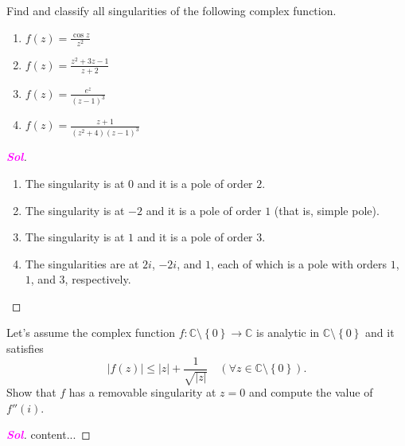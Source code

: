 \documentclass{article}
\theoremstyle{definition}
\newcommand{\set}[1]{\left\{#1\right\}}
\newcommand{\C}{\mathbb{C}}
\newcommand{\abs}[1]{\left\lvert #1 \right\rvert}
\newcommand{\sol}{\textcolor{magenta}{\bf Sol}}
\begin{document}
\vspace{8pt}
\begin{tcolorbox}[colback=white,colframe=white,arc=5pt,title={\color{black}\bf $\bullet$ Classification of Singularities II}]
	Find and classify all singularities of the following complex function.
	\begin{enumerate}[(1)]
		\item $\displaystyle f(z)=\frac{\cos z}{z^2}$
		\item $\displaystyle f(z)=\frac{z^2+3z-1}{z+2}$
		\item $\displaystyle f(z)=\frac{e^z}{(z-1)^3}$
		\item $\displaystyle f(z)=\frac{z+1}{(z^2+4)(z-1)^3}$
	\end{enumerate}
\end{tcolorbox}
\begin{proof}[\sol]
	\begin{enumerate}[(1)]
		\item The singularity is at $0$ and it is a pole of order $2$.
		\item The singularity is at $-2$ and it is a pole of order $1$ (that is, simple pole).
		\item The singularity is at $1$ and it is a pole of order $3$.
		\item The singularities are at $2i$, $-2i$, and $1$, each of which is a pole with orders $1$, $1$, and $3$, respectively.
	\end{enumerate}
\end{proof}
\vspace{8pt}
\begin{tcolorbox}[colback=white,colframe=white,arc=5pt,title={\color{black}\bf \textcolor{red}{$\star$} Classification of Singularities III}]
	Let's assume the complex function $f:\C\setminus\set{0}\to\C$ is analytic in $\C\setminus\set{0}$ and it satisfies \[
	\abs{f(z)}\leq\abs{z}+\frac{1}{\sqrt{\abs{z}}}\quad(\forall z\in\C\setminus\set{0}).
	\] Show that $f$ has a removable singularity at $z=0$ and compute the value of $f''(i)$.
\end{tcolorbox}
\begin{proof}[\sol]
	content...
\end{proof}

\begin{tcolorbox}[colback=white,colframe=white,arc=5pt,title={\color{black}\bf $\bullet$ Series Expansion of a Complex Function III}]
	
\end{tcolorbox}
\end{document}
